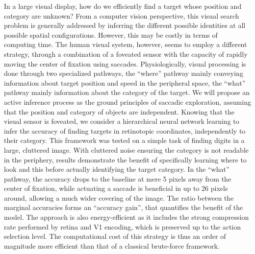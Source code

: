 In a large visual display, how do we efficiently find a target whose position and category are unknown? From a computer vision perspective, this visual search problem is generally addressed by inferring the different possible identities at all possible spatial configurations. However, this may be costly in terms of computing time. The human visual system, however, seems to employ a different strategy, through a combination of a foveated sensor with the capacity of rapidly moving the center of fixation using saccades. Physiologically, visual processing is done through two specialized pathways, the ``where'' pathway mainly conveying information about target position and speed in the peripheral space, the ``what'' pathway mainly information about the category of the target. We will propose an active inference process as the ground principles of saccadic exploration, assuming that the position and category of objects are independent. Knowing that the visual sensor is foveated, we consider a hierarchical neural network learning to infer the accuracy of finding targets in retinotopic coordinates, independently to their category. This framework was tested on a simple task of finding digits in a large, cluttered image. With cluttered noise ensuring the category is not readable in the periphery, results demonstrate the benefit of specifically learning where to look and this before actually identifying the target category. In the ``what'' pathway, the accuracy drops to the baseline at mere 5 pixels away from the center of fixation, while actuating a saccade is beneficial in up to 26 pixels around, allowing a much wider covering of the image. The ratio between the marginal accuracies forms an ``accuracy gain'', that quantifies the benefit of the model. %
The approach is also energy-efficient as it includes the strong compression rate performed by retina and V1 encoding, which is preserved up to the action selection level. The computational cost of this strategy is thus an order of magnitude more efficient than that of a classical brute-force framework.
